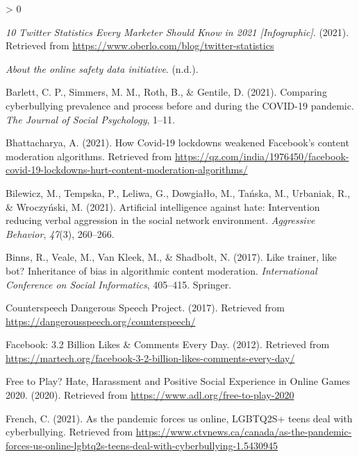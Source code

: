 \documentclass[
  10pt,
  dvipsnames,enabledeprecatedfontcommands]{scrartcl}
\newlength{\cslhangindent}
\newenvironment{CSLReferences}[2] %
 {%
  \setlength{\parindent}{0pt}
  \ifodd #1 \everypar{\setlength{\hangindent}{\cslhangindent}}\ignorespaces\fi
  \ifnum #2 > 0
  \setlength{\parskip}{#2\baselineskip}
  \fi
 }%
 {}
\begin{document}
\hypertarget{refs}{}
\begin{CSLReferences}{1}{0}
\leavevmode\hypertarget{ref-noauthor_10_2021}{}%
\emph{10 {Twitter} {Statistics} {Every} {Marketer} {Should} {Know} in
2021 {[}{Infographic}{]}}. (2021). Retrieved from
\url{https://www.oberlo.com/blog/twitter-statistics}

\leavevmode\hypertarget{ref-onlinesafetydata}{}%
\emph{About the online safety data initiative}. (n.d.).

\leavevmode\hypertarget{ref-barlett2021comparing}{}%
Barlett, C. P., Simmers, M. M., Roth, B., \& Gentile, D. (2021).
Comparing cyberbullying prevalence and process before and during the
COVID-19 pandemic. \emph{The Journal of Social Psychology}, 1--11.

\leavevmode\hypertarget{ref-bhattacharya}{}%
Bhattacharya, A. (2021). How {Covid}-19 lockdowns weakened {Facebook}'s
content moderation algorithms. Retrieved from
\url{https://qz.com/india/1976450/facebook-covid-19-lockdowns-hurt-content-moderation-algorithms/}

\leavevmode\hypertarget{ref-bilewicz2021artificial}{}%
Bilewicz, M., Tempska, P., Leliwa, G., Dowgiałło, M., Tańska, M.,
Urbaniak, R., \& Wroczyński, M. (2021). Artificial intelligence against
hate: Intervention reducing verbal aggression in the social network
environment. \emph{Aggressive Behavior}, \emph{47}(3), 260--266.

\leavevmode\hypertarget{ref-binns2017like}{}%
Binns, R., Veale, M., Van Kleek, M., \& Shadbolt, N. (2017). Like
trainer, like bot? Inheritance of bias in algorithmic content
moderation. \emph{International Conference on Social Informatics},
405--415. Springer.

\leavevmode\hypertarget{ref-noauthor_counterspeech_2017}{}%
Counterspeech {{}} {Dangerous} {Speech} {Project}. (2017). Retrieved
from \url{https://dangerousspeech.org/counterspeech/}

\leavevmode\hypertarget{ref-noauthor_facebook:_2012}{}%
Facebook: 3.2 {Billion} {Likes} \& {Comments} {Every} {Day}. (2012).
Retrieved from
\url{https://martech.org/facebook-3-2-billion-likes-comments-every-day/}

\leavevmode\hypertarget{ref-noauthor_free_nodate}{}%
Free to {Play}? {Hate}, {Harassment} and {Positive} {Social}
{Experience} in {Online} {Games} 2020. (2020). Retrieved from
\url{https://www.adl.org/free-to-play-2020}

\leavevmode\hypertarget{ref-french_as_2021}{}%
French, C. (2021). As the pandemic forces us online, {LGBTQ2S}+ teens
deal with cyberbullying. Retrieved from
\url{https://www.ctvnews.ca/canada/as-the-pandemic-forces-us-online-lgbtq2s-teens-deal-with-cyberbullying-1.5430945}


\end{CSLReferences}
\end{document}
